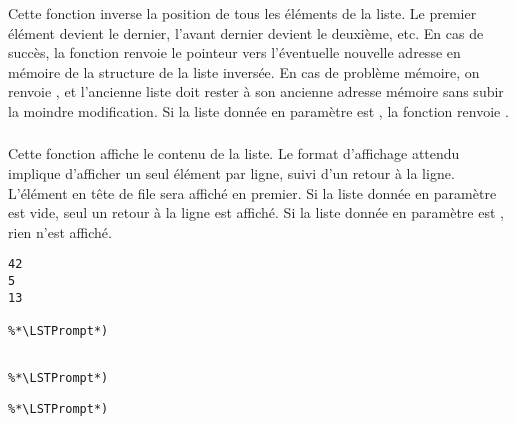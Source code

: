 \noindent Cette fonction inverse la position de tous les éléments de la liste.
Le premier élément devient le dernier, l'avant dernier devient le deuxième, etc.
En cas de succès, la fonction renvoie le pointeur vers l'éventuelle nouvelle adresse en mémoire de la structure de la liste inversée.
En cas de problème mémoire, on renvoie , et l'ancienne liste doit rester à son ancienne adresse mémoire sans subir la moindre modification.
Si la liste donnée en paramètre est , la fonction renvoie .


\subsubsection*{}

\noindent Cette fonction affiche le contenu de la liste.
Le format d'affichage attendu implique d'afficher un seul élément par ligne, suivi d'un retour à la ligne.
L'élément en tête de file sera affiché en premier.
Si la liste donnée en paramètre est vide, seul un retour à la ligne est affiché.
Si la liste donnée en paramètre est , rien n'est affiché.

\bigskip

\lstset{style=sh}
\begin{lstlisting}[frame=single,title={Exemple d'affichage du cas normal : liste chaînée contenant 42, 5, 13 dans cet ordre précis}]
%*\LSTPrompt*) ./my_linked_list
42
5
13

%*\LSTPrompt*)
\end{lstlisting}

\bigskip

\lstset{style=sh}
\begin{lstlisting}[frame=single,title={Exemple d'affichage d'une liste chainée vide}]
%*\LSTPrompt*) ./my_linked_list

%*\LSTPrompt*)
\end{lstlisting}

\bigskip

\lstset{style=sh}
\begin{lstlisting}[frame=single,title={Exemple d'affichage d'un pointeur NULL}]
%*\LSTPrompt*) ./my_linked_list
%*\LSTPrompt*)
\end{lstlisting}
